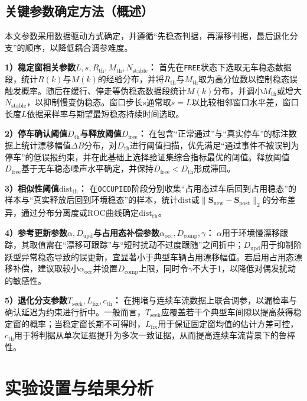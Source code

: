 \documentclass{xdupgthesis}
\begin{document}
\subsection{关键参数确定方法（概述）}
\label{subsec:ch4_paramset}

本文参数采用数据驱动方式确定，并遵循“先稳态判据，再漂移判据，最后退化分支”的顺序，以降低耦合调参难度。

\textbf{1）稳定窗相关参数$L,s,R_{\mathrm{th}},M_{\mathrm{th}},N_{\mathrm{stable}}$：}
首先在\texttt{FREE}状态下选取无车稳态数据段，统计$R(k)$与$M(k)$的经验分布，并将$R_{\mathrm{th}}$与$M_{\mathrm{th}}$取为高分位数以控制稳态误触发概率。随后在缓行、停走等伪稳态数据段统计$M(k)$分布，并调小$M_{\mathrm{th}}$或增大$N_{\mathrm{stable}}$，以抑制慢变伪稳态。窗口步长$s$通常取$s=L$以比较相邻窗口水平差，窗口长度$L$依据采样率与期望最短稳态持续时间选取。

\textbf{2）停车确认阈值$D_{\mathrm{th}}$与释放阈值$D_{\mathrm{free}}$：}
在包含“正常通过”与“真实停车”的标注数据上统计漂移幅值$\Delta B$分布，对$D_{\mathrm{th}}$进行阈值扫描，优先满足“通过事件不被误判为停车”的低误报约束，并在此基础上选择验证集综合指标最优的阈值。释放阈值$D_{\mathrm{free}}$基于无车稳态噪声水平确定，并保持$D_{\mathrm{free}}<D_{\mathrm{th}}$形成滞回。

\textbf{3）相似性阈值$\mathrm{dist}_{\mathrm{th}}$：}
在\texttt{OCCUPIED}阶段分别收集“占用态过车后回到占用稳态”的样本与“真实释放后回到环境稳态”的样本，统计$\mathrm{dist}$或$\lVert\mathbf{S}_{\mathrm{new}}-\mathbf{S}_{\mathrm{post}}\rVert_2$的分布差异，通过分布分离度或ROC曲线确定$\mathrm{dist}_{\mathrm{th}}$。

\textbf{4）参考更新参数$\alpha,D_{\mathrm{upd}}$与占用态补偿参数$\alpha_{\mathrm{occ}},D_{\mathrm{comp}},\gamma$：}
$\alpha$用于环境慢漂移跟踪，其取值需在“漂移可跟踪”与“短时扰动不过度跟随”之间折中；$D_{\mathrm{upd}}$用于抑制阶跃型异常稳态导致的误更新，宜显著小于典型车辆占用漂移幅值。若启用占用态漂移补偿，建议取较小$\alpha_{\mathrm{occ}}$并设置$D_{\mathrm{comp}}$上限，同时令$\gamma$不大于1，以降低对偶发扰动的敏感性。

\textbf{5）退化分支参数$T_{\mathrm{seek}},L_{\mathrm{fix}},c_{\mathrm{th}}$：}
在拥堵与连续车流数据上联合调参，以漏检率与确认延迟为约束进行折中。一般而言，$T_{\mathrm{seek}}$应覆盖若干个典型车间隙以提高获得稳定窗的概率；当稳定窗长期不可得时，$L_{\mathrm{fix}}$用于保证固定窗均值的估计方差可控，$c_{\mathrm{th}}$用于将判据从单次证据提升为多次一致证据，从而提高连续车流背景下的鲁棒性。


\section{实验设置与结果分析}
\label{sec:ch4_exp}
\end{document}
